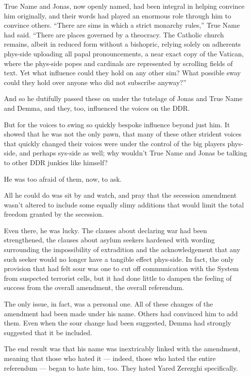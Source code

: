 True Name and Jonas, now openly named, had been integral in helping convince him originally, and their words had played an enormous role through him to convince others. ``There are sims in which a strict monarchy rules,'' True Name had said. ``There are places governed by a theocracy. The Catholic church remains, albeit in reduced form without a bishopric, relying solely on adherents phys-side uploading all papal pronouncements, a near exact copy of the Vatican, where the phys-side popes and cardinals are represented by scrolling fields of text. Yet what influence could they hold on any other sim? What possible sway could they hold over anyone who did not subscribe anyway?''

And so he dutifully passed these on under the tutelage of Jonas and True Name and Demma, and they, too, influenced the voices on the DDR.

But for the voices to swing so quickly bespoke influence beyond just him. It showed that he was not the only pawn, that many of these other strident voices that quickly changed their voices were under the control of the big players phys-side, and perhaps sys-side as well; why wouldn't True Name and Jonas be talking to other DDR junkies like himself?

He was too afraid of them, now, to ask.

All he could do was sit by and watch, and pray that the secession amendment wasn't altered to include some equally slimy additions that would limit the total freedom granted by the secession.

Even there, he was lucky. The clauses about declaring war had been strengthened, the clauses about asylum seekers hardened with wording surrounding the impossibility of extradition and the acknowledgement that any such seeker would no longer have a tangible effect phys-side. In fact, the only provision that had felt sour was one to cut off communication with the System from suspected terrorist cells, but it had done little to dampen the feeling of success from the overall amendment, the overall referendum.

The only issue, in fact, was a personal one. All of these changes of the amendment had been made under his name. Others had convinced him to add them. Even when the sour change had been suggested, Demma had strongly suggested that it be included.

The end result was that his name was inextricably linked with the amendment, meaning that those who hated it — indeed, those who hated the entire referendum — began to hate him, too. They hated Yared Zerezghi specifically.

